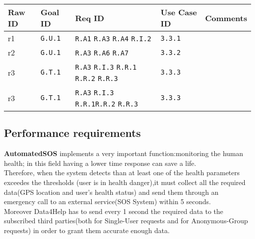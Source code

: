  \begin{table}[h!]
   \centering
    \begin{tabularx}{\linewidth}{|X|X|X|X|X|}
         \hline
         \textbf{Raw ID} & \textbf{Goal ID} & \textbf{Req ID} & \textbf{Use Case ID} & \textbf{Comments} \\
	\hline
	r1 & \texttt{G.U.1} & \texttt{R.A1}  \newline \texttt{R.A3}  \newline \texttt{R.A4} \newline \texttt{R.I.2}& \texttt{3.3.1}&  \\
	\hline
	r2 & \texttt{G.U.1} & \texttt{R.A3}  \newline \texttt{R.A6}  \newline \texttt{R.A7} & \texttt{3.3.2} & \\
	\hline
	r3 & \texttt{G.T.1} & \texttt{R.A3}  \newline \texttt{R.I.3}  \newline \texttt{R.R.1} \newline \texttt{R.R.2} \newline \texttt{R.R.3}& \texttt{3.3.3}  &  \\
\hline
r3 & \texttt{G.T.1} & \texttt{R.A3} \newline  \texttt{R.I.3} \newline \texttt{R.R.1}\newline \texttt{R.R.2} \newline \texttt{R.R.3}& \texttt{3.3.3}  &  \\
\hline
	\end{tabularx}
      \end{table}
  \subsection{Performance requirements}
\textbf{AutomatedSOS} implements a very important function:monitoring the human health; in this field having a lower time response can save a life.\\ Therefore, when the system detects than at least one of the health parameters exceedes the thresholds (user is in health danger),it must collect all the required data(GPS location and user's health status) and send them through an emergency call to an external service(SOS System) within 5 seconds.\\
Moreover Data4Help has to send every 1 second the required data to the subscribed third parties(both for Single-User requests and for Anonymous-Group requests) in order to grant them accurate enough data.
